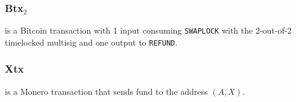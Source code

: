 \documentclass{llncs}
\begin{document}
\subsubsection{Btx$_2$}
is a Bitcoin transaction with 1 input consuming \texttt{SWAPLOCK} with the 2-out-of-2 timelocked multisig and one output to \texttt{REFUND}.

\subsubsection{Xtx}
is a Monero transaction that sends fund to the address $(A,X)$.


%
%
\printbibliography
\end{document}
